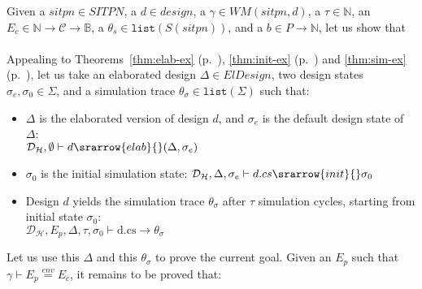 \documentclass[dvipsnames,12pt]{article}
\begin{document}
\begin{niproof}
  Given a $sitpn\in{}SITPN$, a $d\in{}design$, a
  $\gamma\in{}WM(sitpn,d)$, a $\tau\in\mathbb{N}$, an
  $E_c\in{}\mathbb{N}\rightarrow{}\mathcal{C}\rightarrow{}\mathbb{B}$,
  a $\theta_s\in\mathtt{list}(S(sitpn))$, and a $b\in{}P\rightarrow\mathbb{N}$, let us show that\\
  \\

  Appealing to Theorems~\ref{thm:elab-ex} (p.~\pageref{thm:elab-ex}),
  \ref{thm:init-ex} (p.~\pageref{thm:init-ex}) and \ref{thm:sim-ex}
  (p.~\pageref{thm:sim-ex}), let us take an elaborated design
  $\Delta\in{}ElDesign$, two design states
  $\sigma_e,\sigma_0\in\Sigma$, and a simulation trace
  $\theta_\sigma\in\mathtt{list}(\Sigma)$ such that:
  \begin{itemize}[label=--]
  \item $\Delta$ is the elaborated version of design $d$, and
    $\sigma_e$ is the default design state of $\Delta$:\\
    $\mathcal{D}_\mathcal{H},\emptyset\vdash{}d\srarrow{elab}{\fontsize{6}{8}\selectfont}(\Delta,\sigma_{e})$
  \item $\sigma_0$ is the initial simulation state:
    $\mathcal{D}_\mathcal{H},\Delta,\sigma_{e}\vdash{}d.cs\srarrow{init}{\fontsize{6}{8}\selectfont}\sigma_0$
  \item Design $d$ yields the simulation trace $\theta_\sigma$ after
    $\tau$ simulation cycles, starting from initial state $\sigma_0$:\\
    $\mathcal{D}_\mathcal{H},E_p,\Delta,\tau,\sigma_0\vdash{}\mathrm{d.cs}\rightarrow\theta_\sigma$
  \end{itemize}

  Let us use this $\Delta$ and this $\theta_\sigma$ to prove the
  current goal. Given an $E_p$ such that
  $\gamma\vdash{}E_p\stackrel{env}{=}E_c$, it remains to be proved
  that:

  \\
  

\end{niproof}
\end{document}
